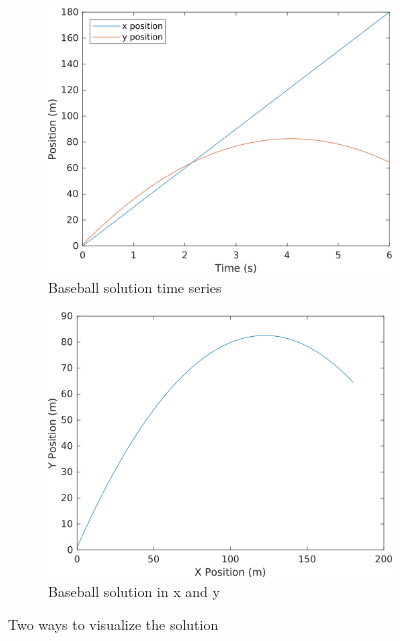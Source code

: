 \begin{figure}[h]
    \centering
    \begin{subfigure}{0.45\textwidth}
        \centering
        \includegraphics[width=\linewidth]{../code/chap12/baseball_time.png}
        \caption{Baseball solution time series}
    \end{subfigure}
    \quad %
    \begin{subfigure}{0.45\textwidth}
        \centering
        \includegraphics[width=\linewidth]{../code/chap12/baseball_xy.png}
        \caption{Baseball solution in x and y}
    \end{subfigure}
    \caption{Two ways to visualize the solution}
    \label{f:baseball1}
\end{figure}

